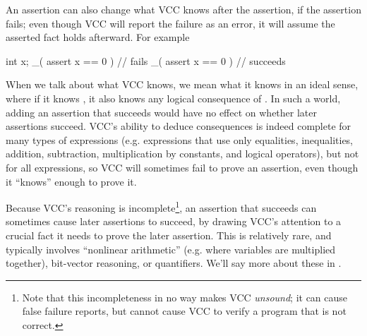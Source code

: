 An assertion can also change what VCC knows after the assertion, if
the assertion fails; even though VCC will report the failure as an error,
it will assume the asserted fact holds afterward. For example
\begin{VCC}
int x;
_( assert x == 0 ) // fails
_( assert x == 0 ) // succeeds
\end{VCC}

When we talk about what VCC knows, we mean what it knows in an ideal
sense, where if it knows , it also knows any logical
consequence of . In such a world, adding an assertion that
succeeds would have no effect on whether later assertions succeed.
VCC's ability to deduce consequences is indeed complete for many types
of expressions (e.g. expressions that use only equalities,
inequalities, addition, subtraction, multiplication by constants, and
logical operators), but not for all expressions, so VCC will
sometimes fail to prove an assertion, even though it ``knows'' enough
to prove it.  

Because VCC's reasoning is incomplete\footnote{Note that this
  incompleteness in no way makes VCC \emph{unsound}; it can cause
  false failure reports, but cannot cause VCC to verify a program that
  is not correct.}, an assertion that succeeds can sometimes cause
later assertions to succeed, by drawing VCC's attention to a crucial
fact it needs to prove the later assertion.  This is relatively rare,
and typically involves ``nonlinear arithmetic'' (e.g. where variables
are multiplied together), bit-vector reasoning, or quantifiers. We'll
say more about these in .

